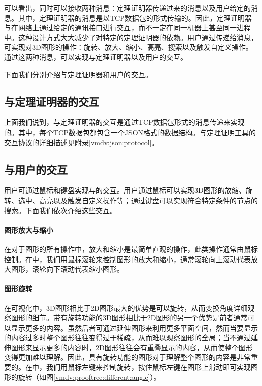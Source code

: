 可以看出，同时可以接收两种消息：定理证明器传递过来的消息以及用户给定的消息。其中，定理证明器的消息是以\textsf{TCP}数据包的形式传输的。因此，定理证明器与在网络上通过给定的通讯接口进行交互，而不一定在同一机器上甚至同一进程中。这种设计方式大大减少了对特定的定理证明器的依赖。用户通过传递给消息，可实现对3D图形的操作：旋转、放大、缩小、高亮、搜索以及触发自定义操作。通过这两种消息，可以实现与定理证明器以及用户的交互。

下面我们分别介绍与定理证明器和用户的交互。
\subsection{与定理证明器的交互}
上面我们说到，与定理证明器的交互是通过\textsf{TCP}数据包形式的消息传递来实现的。其中，每个\textsf{TCP}数据包都包含一个\textsf{JSON}格式的数据结构。与定理证明工具的交互协议的详细描述见附录\ref{vmdv:json:protocol}。


\subsection{与用户的交互}
用户可通过鼠标和键盘实现与的交互。用户通过鼠标可以实现3D图形的放缩、旋转、选中、高亮以及触发自定义操作等；通过键盘可以实现符合特定条件的节点的搜索。下面我们依次介绍这些交互。
\paragraph{图形放大与缩小}
在对于图形的所有操作中，放大和缩小是最简单直观的操作，此类操作通常由鼠标控制。在中，我们用鼠标滚轮来控制图形的放大和缩小，通常滚轮向上滚动代表放大图形，滚轮向下滚动代表缩小图形。
\paragraph{图形旋转}
在可视化中，3D图形相比于2D图形最大的优势是可以旋转，从而变换角度详细观察图形的细节。带有旋转功能的3D图形相比于2D图形的另一个优势是前者通常可以显示更多的内容。虽然后者可通过延伸图形来利用更多平面空间，然而当要显示的内容过多时整个图形往往变得过于稀疏，从而难以观察图形的全局；当不通过延伸图形来显示更多的内容时，2D图形往往会有重叠显示的内容，从而使整个图形变得更加难以理解。因此，具有旋转功能的图形对于理解整个图形的内容是非常重要的。在中，我们用鼠标左键来控制旋转，按住鼠标左键在图形上滑动即可实现图形的旋转（如图\ref{vmdv:prooftree:different:angle}）。

